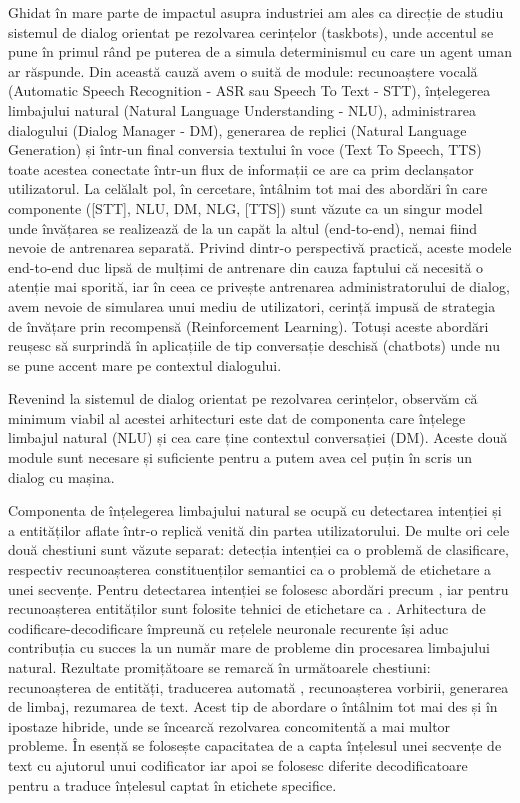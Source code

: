 Ghidat în mare parte de impactul asupra industriei am ales ca direcție de studiu sistemul de dialog orientat pe rezolvarea cerințelor (taskbots), unde accentul se pune în primul rând pe puterea de a simula determinismul cu care un agent uman ar răspunde. Din această cauză avem o suită de module: recunoaștere vocală (Automatic Speech Recognition - ASR sau Speech To Text - STT), înțelegerea limbajului natural (Natural Language Understanding - NLU), administrarea dialogului (Dialog Manager - DM), generarea de replici (Natural Language Generation) și într-un final conversia textului în voce (Text To Speech, TTS) toate acestea conectate într-un flux de informații ce are ca prim declanșator utilizatorul. La celălalt pol, în cercetare, întâlnim tot mai des abordări în care componente ([STT], NLU, DM, NLG, [TTS]) sunt văzute ca un singur model unde învățarea se realizează de la un capăt la altul (end-to-end)\cite{end-to-end-goal-oriented}, nemai fiind nevoie de antrenarea separată. Privind dintr-o perspectivă practică, aceste modele end-to-end duc lipsă de mulțimi de antrenare din cauza faptului că necesită o atenție mai sporită, iar în ceea ce privește antrenarea administratorului de dialog, avem nevoie de simularea unui mediu de utilizatori, cerință impusă de strategia de învățare prin recompensă (Reinforcement Learning). Totuși aceste abordări reușesc să surprindă în aplicațiile de tip conversație deschisă (chatbots) unde nu se pune accent mare pe contextul dialogului.

Revenind la sistemul de dialog orientat pe rezolvarea cerințelor, observăm că minimum viabil al acestei arhitecturi este dat de componenta care înțelege limbajul natural (NLU) și cea care ține contextul conversației (DM). Aceste două module sunt necesare și suficiente pentru a putem avea cel puțin în scris un dialog cu mașina. 

Componenta de înțelegerea limbajului natural se ocupă cu detectarea intenției și a entităților aflate într-o replică venită din partea utilizatorului. De multe ori cele două chestiuni sunt văzute separat: detecția intenției ca o problemă de clasificare, respectiv recunoașterea constituenților semantici ca o problemă de etichetare a unei secvențe.
Pentru detectarea intenției se folosesc abordări precum \cite{id_classifiers}, iar pentru recunoașterea entităților sunt folosite tehnici de etichetare ca \cite{scipy_numpyeq_labeling}.
Arhitectura de codificare-decodificare împreună cu rețelele neuronale recurente își aduc contribuția cu succes la un număr mare de probleme din procesarea limbajului natural. Rezultate promițătoare se remarcă în următoarele chestiuni: recunoașterea de entități, traducerea automată  \cite{luoung_bahdanau_maning}, recunoașterea vorbirii, generarea de limbaj, rezumarea de text. Acest tip de abordare o întâlnim tot mai des și în ipostaze hibride, unde se încearcă rezolvarea concomitentă a mai multor probleme. În esență se folosește capacitatea de a capta înțelesul unei secvențe de text cu ajutorul unui codificator iar apoi se folosesc diferite decodificatoare pentru a traduce înțelesul captat în etichete specifice.

